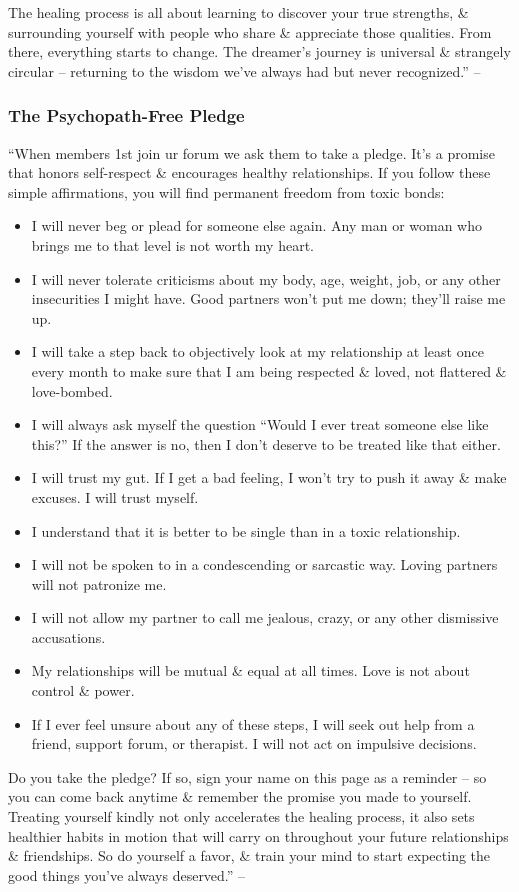 \documentclass{article}
\numberwithin{equation}{section}
\begin{document}
The healing process is all about learning to discover your true strengths, \& surrounding yourself with people who share \& appreciate those qualities. From there, everything starts to change. The dreamer's journey is universal \& strangely circular -- returning to the wisdom we've always had but never recognized.'' -- \cite[pp. 163--164]{MacKenzie2015}

\subsubsection{The Psychopath-Free Pledge}
``When members 1st join ur forum we ask them to take a pledge. It's a promise that honors self-respect \& encourages healthy relationships. If you follow these simple affirmations, you will find permanent freedom from toxic bonds:
\begin{itemize}
	\item I will never beg or plead for someone else again. Any man or woman who brings me to that level is not worth my heart.
	\item I will never tolerate criticisms about my body, age, weight, job, or any other insecurities I might have. Good partners won't put me down; they'll raise me up.
	\item I will take a step back to objectively look at my relationship at least once every month to make sure that I am being respected \& loved, not flattered \& love-bombed.
	\item I will always ask myself the question ``Would I ever treat someone else like this?'' If the answer is no, then I don't deserve to be treated like that either.
	\item I will trust my gut. If I get a bad feeling, I won't try to push it away \& make excuses. I will trust myself.
	\item I understand that it is better to be single than in a toxic relationship.
	\item I will not be spoken to in a condescending or sarcastic way. Loving partners will not patronize me.
	\item I will not allow my partner to call me jealous, crazy, or any other dismissive accusations.
	\item My relationships will be mutual \& equal at all times. Love is not about control \& power.
	\item If I ever feel unsure about any of these steps, I will seek out help from a friend, support forum, or therapist. I will not act on impulsive decisions.
\end{itemize}
Do you take the pledge? If so, sign your name on this page as a reminder -- so you can come back anytime \& remember the promise you made to yourself. Treating yourself kindly not only accelerates the healing process, it also sets healthier habits in motion that will carry on throughout your future relationships \& friendships. So do yourself a favor, \& train your mind to start expecting the good things you've always deserved.'' -- \cite[pp. 164--165]{MacKenzie2015}
\end{document}

